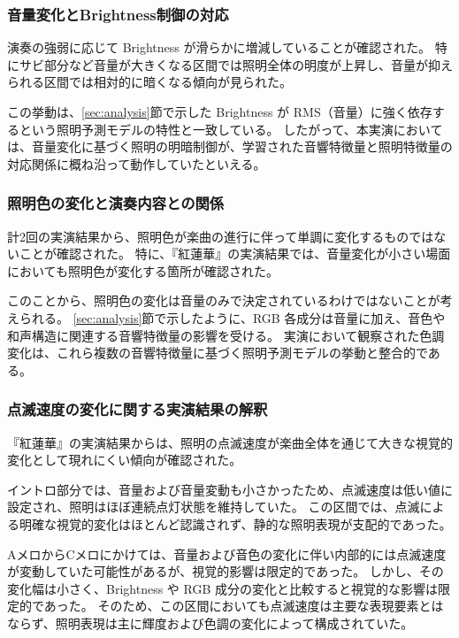 \subsubsection{音量変化とBrightness制御の対応}

演奏の強弱に応じて Brightness が滑らかに増減していることが確認された。
特にサビ部分など音量が大きくなる区間では照明全体の明度が上昇し、音量が抑えられる区間では相対的に暗くなる傾向が見られた。

この挙動は、\ref{sec:analysis}節で示した Brightness が RMS（音量）に強く依存するという照明予測モデルの特性と一致している。
したがって、本実演においては、音量変化に基づく照明の明暗制御が、学習された音響特徴量と照明特徴量の対応関係に概ね沿って動作していたといえる。

\subsubsection{照明色の変化と演奏内容との関係}

計2回の実演結果から、照明色が楽曲の進行に伴って単調に変化するものではないことが確認された。
特に、『紅蓮華』の実演結果では、音量変化が小さい場面においても照明色が変化する箇所が確認された。

このことから、照明色の変化は音量のみで決定されているわけではないことが考えられる。
\ref{sec:analysis}節で示したように、RGB 各成分は音量に加え、音色や和声構造に関連する音響特徴量の影響を受ける。
実演において観察された色調変化は、これら複数の音響特徴量に基づく照明予測モデルの挙動と整合的である。

\subsubsection{点滅速度の変化に関する実演結果の解釈}

『紅蓮華』の実演結果からは、照明の点滅速度が楽曲全体を通じて大きな視覚的変化として現れにくい傾向が確認された。

イントロ部分では、音量および音量変動も小さかったため、点滅速度は低い値に設定され、照明はほぼ連続点灯状態を維持していた。
この区間では、点滅による明確な視覚的変化はほとんど認識されず、静的な照明表現が支配的であった。

AメロからCメロにかけては、音量および音色の変化に伴い内部的には点滅速度が変動していた可能性があるが、視覚的影響は限定的であった。
しかし、その変化幅は小さく、Brightness や RGB 成分の変化と比較すると視覚的な影響は限定的であった。
そのため、この区間においても点滅速度は主要な表現要素とはならず、照明表現は主に輝度および色調の変化によって構成されていた。

